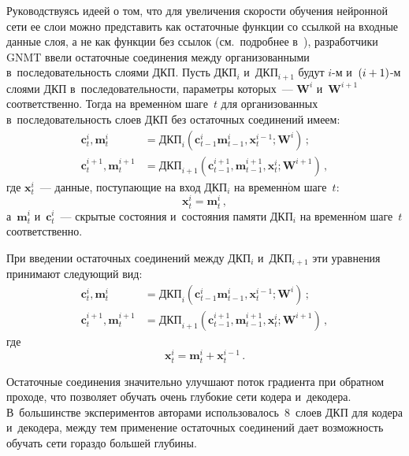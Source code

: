\begin{multicols}{2}
  Руководствуясь идеей о том, что для увеличения скорости обучения 
нейронной сети ее слои можно представить как остаточные функции со 
ссылкой на входные данные слоя, а не как функции без ссылок (см.\ подробнее 
в~\cite{14-nur, 20-nur, 21-nur}), разработчики GNMT ввели остаточные 
соединения между организованными в~последовательность слоями ДКП. Пусть 
ДКП$_i$ и~ДКП$_{i+1}$ будут $i$-м и~$(i\hm+1)$-м слоями ДКП 
в~последовательности, параметры которых~--- $\mathbf{W}^i$ 
и~$\mathbf{W}^{i+1}$ соответственно. Тогда на временн$\acute{\mbox{о}}$м шаге~$t$ для 
организованных в~последовательность слоев ДКП без остаточных соединений 
имеем:
  \begin{align*}
  \mathbf{c}_t^i, \mathbf{m}_t^i&=\mbox{ДКП}_i\left(\mathbf{c}^i_{t-1} 
\mathbf{m}^i_{t-1}, \mathbf{x}_t^{i-1};\mathbf{W}^i\right)\,;\\
  \mathbf{c}_t^{i+1}, \mathbf{m}_t^{i+1} &=\mbox{ДКП}_{i+1} 
\left(\mathbf{c}_{t-1}^{i+1}, \mathbf{m}_{t-1}^{i+1}, \mathbf{x}_t^i; 
\mathbf{W}^{i+1}\right)\,,
  \end{align*}
где $\mathbf{x}_t^i$~--- данные, поступающие на вход ДКП$_i$ на временн$\acute{\mbox{о}}$м 
шаге~$t$: 
$$
  \mathbf{x}_t^i=\mathbf{m}_t^i\,,
  $$ 
  а~$\mathbf{m}_t^i$ и~$\mathbf{c}_t^i$~--- скрытые состояния 
и~состояния памяти ДКП$_i$ на временн$\acute{\mbox{о}}$м шаге~$t$ соответственно.

  При введении остаточных соединений между ДКП$_i$ и~ДКП$_{i+1}$ эти 
уравнения принимают следующий вид:
  \begin{align*}
  \mathbf{c}_t^i, \mathbf{m}_t^i&=\mbox{ДКП}_i\left(\mathbf{c}^i_{t-1} 
\mathbf{m}^i_{t-1}, \mathbf{x}_t^{i-1};\mathbf{W}^i\right)\,;\\
  \mathbf{c}_t^{i+1}, \mathbf{m}_t^{i+1} &=\mbox{ДКП}_{i+1} 
\left(\mathbf{c}_{t-1}^{i+1}, \mathbf{m}_{t-1}^{i+1}, \mathbf{x}_t^i; 
\mathbf{W}^{i+1}\right)\,,
  \end{align*}
  где
  $$
    \mathbf{x}_t^i=\mathbf{m}_t^i+\mathbf{x}_t^{i-1}\,.
    $$
  
  Остаточные соединения значительно улучшают поток градиента при 
обратном проходе, что позволяет обучать очень глубокие сети кодера 
и~декодера. В~большинстве экспериментов авторами использовалось~8~слоев 
ДКП для кодера и~декодера, между тем применение остаточных соединений 
дает возможность обучать сети гораздо большей глубины.
  

\end{multicols}
